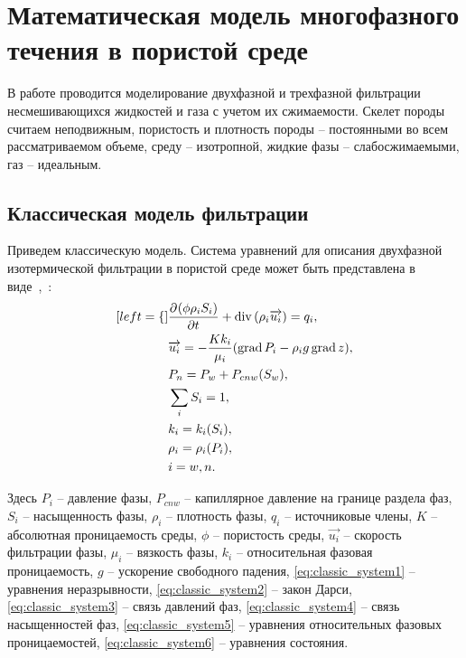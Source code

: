\chapter{Математическая модель многофазного течения в пористой среде} \label{ch:ch1}

\newcommand*{\pd}[3][]{\ensuremath{\dfrac{\partial^{#1} #2}{\partial #3^{#1}}}}
\newcommand*{\dd}[3][]{\ensuremath{\dfrac{\mathrm d^{#1} #2}{\mathrm d #3^{#1}}}}
\newcommand{\grad}{\mathop{\mathrm{grad}}\nolimits}
\newcommand{\diver}{\mathop{\mathrm{div}}\nolimits}

В работе проводится моделирование двухфазной и трехфазной фильтрации
несмешивающихся жидкостей и газа с учетом их сжимаемости. Скелет породы считаем неподвижным, пористость и плотность породы -- постоянными во всем рассматриваемом объеме, среду -- изотропной, жидкие фазы -- слабосжимаемыми, газ -- идеальным.

\section{Классическая модель фильтрации} \label{sec:ch1/sec1}

Приведем классическую модель. Система уравнений для описания двухфазной изотермической фильтрации в пористой среде
может быть представлена в виде~\cite{Aziz-Settari},~\cite{Basniev}:
\begin{subequations} \label{eq:classic_system}
  \begin{align}[left = \empheqlbrace\,]
    &\pd {(\phi \rho_i S_i)}{t} + \diver{(\rho_i \overrightarrow{u_i})} = q_i, \label{eq:classic_system1} \\
    &\overrightarrow{u_i} = -\frac{K k_i}{\mu_i}(\grad {P_i} - {\rho}_i g \grad {z}), \label{eq:classic_system2} \\
    &P_n = P_w + P_{cnw}({S}_w), \label{eq:classic_system3} \\
    &\sum_{i}S_i = 1, \label{eq:classic_system4} \\
    &k_i = k_i({S}_i), \label{eq:classic_system5} \\
    &\rho_i = \rho_i(P_i), \label{eq:classic_system6} \\
    &i = w,n \nonumber .
  \end{align}
\end{subequations}

Здесь 
$P_i$ -- давление фазы,
$P_{cnw}$ -- капиллярное давление на границе раздела фаз,
$S_i$ -- насыщенность фазы,
${\rho}_i$ -- плотность фазы,
$q_i$ -- источниковые члены,
$K$ -- абсолютная проницаемость среды,
$\phi$ -- пористость среды,
$\overrightarrow{u_i}$ -- скорость фильтрации фазы,
$\mu_i$ -- вязкость фазы,
$k_i$ -- относительная фазовая проницаемость,
$g$ -- ускорение свободного падения,
\eqref{eq:classic_system1} -- уравнения неразрывности,
\eqref{eq:classic_system2} -- закон Дарси,
\eqref{eq:classic_system3} -- связь давлений фаз,
\eqref{eq:classic_system4} -- связь насыщенностей фаз,
\eqref{eq:classic_system5} -- уравнения относительных фазовых проницаемостей,
\eqref{eq:classic_system6} -- уравнения состояния.

